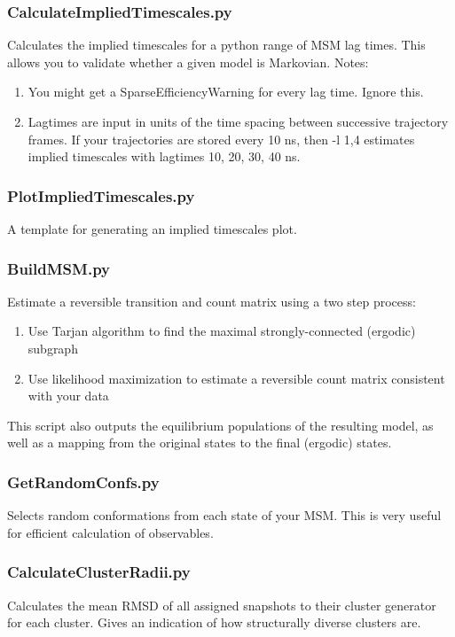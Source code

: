 \documentclass[12pt]{article}
\begin{document}
\subsubsection{CalculateImpliedTimescales.py}
Calculates the implied timescales for a python range of MSM lag times.  This allows you to validate whether a given model is Markovian.  
	Notes:
\begin{enumerate}
 \item You might get a SparseEfficiencyWarning for every lag time. Ignore this.
 \item Lagtimes are input in units of the time spacing between successive trajectory frames.  If your trajectories are stored every 10 ns, then -l 1,4 estimates implied timescales with lagtimes 10, 20, 30, 40 ns.  
\end{enumerate}

\subsubsection{PlotImpliedTimescales.py}
A template for generating an implied timescales plot.

\subsubsection{BuildMSM.py}
Estimate a reversible transition and count matrix using a two step process:
\begin{enumerate}
 \item Use Tarjan algorithm to find the maximal strongly-connected (ergodic) subgraph
 \item Use likelihood maximization to estimate a reversible count matrix consistent with your data
\end{enumerate}

This script also outputs the equilibrium populations of the resulting model, as well as a mapping from the original states to the final (ergodic) states.

\subsubsection{GetRandomConfs.py}
Selects random conformations from each state of your MSM. This is very useful for efficient calculation of observables.

\subsubsection{CalculateClusterRadii.py}
Calculates the mean RMSD of all assigned snapshots to their cluster generator for each cluster. Gives an indication of how structurally diverse clusters are.
\end{document}
